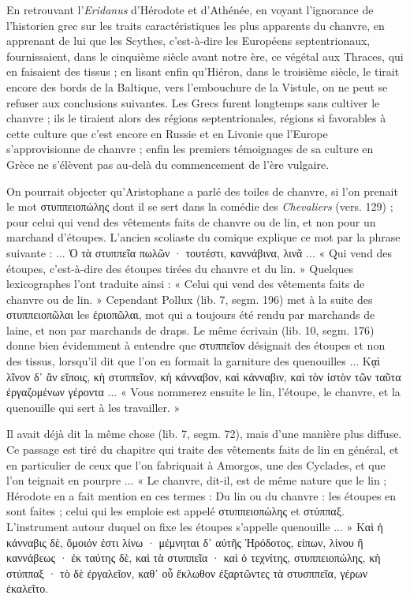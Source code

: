 \documentclass[a4paper, 11pt, oneside, polutonikogreek]{article}
\begin{document}
En retrouvant l'\emph{Eridanus} d'Hérodote et d'Athénée, en voyant l'ignorance de l'historien grec sur les traits caractéristiques les plus apparents du chanvre, en apprenant de lui que les Scythes, c'est-à-dire les Européens septentrionaux, fournissaient, dans le cinquième siècle avant notre ère, ce végétal aux Thraces, qui en faisaient des tissus ; en lisant enfin qu'Hiéron, dans le troisième siècle, le tirait encore des bords de la Baltique, vers l'embouchure de la Vistule, on ne peut se refuser aux conclusions suivantes. Les Grecs furent longtemps sans cultiver le chanvre ; ils le tiraient alors des régions septentrionales, régions si favorables à cette culture que c'est encore en Russie et en Livonie que l'Europe s'approvisionne de chanvre ; enfin les premiers témoignages de sa culture en Grèce ne s'élèvent pas au-delà du commencement de l'ère vulgaire.

On pourrait objecter qu'Aristophane a parlé des toiles de chanvre, si l'on prenait le mot στυππειοπώλης dont il se sert dans la comédie des \emph{Chevaliers} (vers. 129) ; pour celui qui vend des vêtements faits de chanvre ou de lin, et non pour un marchand d'étoupes. L'ancien scoliaste du comique explique ce mot par la phrase suivante : ... Ὀ τὰ στυππεῖα πωλῶν · τουτέστι, καννάβινα, λινᾶ ... « Qui vend des étoupes, c'est-à-dire des étoupes tirées du chanvre et du lin. » Quelques lexicographes l'ont traduite ainsi : « Celui qui vend des vêtements faits de chanvre ou de lin. » Cependant Pollux (lib. 7, segm. 196) met à la suite des στυππειοπῶλαι les ἐριοπῶλαι, mot qui a toujours été rendu par marchands de laine, et non par marchands de draps. Le même écrivain (lib. 10, segm. 176) donne bien évidemment à entendre que στυππεῖον désignait des étoupes et non des tissus, lorsqu'il dit que l'on en formait la garniture des quenouilles ... Κᾳὶ λῖνον δ᾽ ἂν εἴποις, κὴ στυππεῖον, κὴ κάνναβον, καὶ κάνναβιν, καὶ τὸν ἱστὸν τῶν ταῦτα ἐργαζομένων γέροντα ... « Vous nommerez ensuite le lin, l'étoupe, le chanvre, et la quenouille qui sert à les travailler. »

Il avait déjà dit la même chose (lib. 7, segm. 72), mais d'une manière plus diffuse. Ce passage est tiré du chapitre qui traite des vêtements faits de lin en général, et en particulier de ceux que l'on fabriquait à Amorgos, une des Cyclades, et que l'on teignait en pourpre ... « Le chanvre, dit-il, est de même nature que le lin ; Hérodote en a fait mention en ces termes : Du lin ou du chanvre : les étoupes en sont faites ; celui qui les emploie est appelé στυππειοπώλης et στύππαξ. L'instrument autour duquel on fixe les étoupes s'appelle quenouille ... » Καὶ ἡ κάνναβις δὲ, ὅμοιόν ἐστι λίνω · μέμνηται δ᾽ αὐτῆς Ἡρόδοτος, εἰπων, λίνου ἢ καννάβεως · ἐκ ταύτης δὲ, καὶ τὰ στυππεῖα · καὶ ὁ τεχνίτης, στυππειοπώλης, κὴ στύππαξ · τὸ δὲ ἐργαλεῖον, καθ᾽ οὗ ἔκλωθον ἐξαρτῶντες τὰ στυσππεῖα, γέρων ἐκαλεῖτο.
\end{document}
